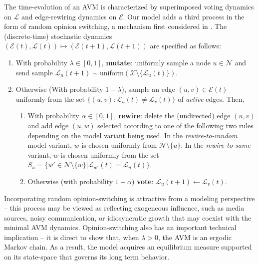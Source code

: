 \documentclass[review, onefignum, onetabnum]{siamart171218}
\begin{document}
	The time-evolution of an AVM is characterized by superimposed voting dynamics on $\mathcal{L}$ and edge-rewiring dynamics on $\mathcal{E}$. 
	Our model adds a third process in the form of random opinion switching, a mechanism first considered in \cite{Ji2013}. 
	The (discrete-time) stochastic dynamics $(\mathcal{E}(t), \mathcal{L}(t)) \mapsto (\mathcal{E}(t+1), \mathcal{L}(t+1))$ are specified as follows:
		\begin{enumerate}
			\item With probability $\lambda \in [0,1]$, \textbf{mutate}: uniformly sample a node $u\in \mathcal{N}$ and send sample $\mathcal{L}_u(t+1)  \sim \mathrm{uniform}(\mathcal{X}\setminus \{\mathcal{L}_u(t)\})$.  
			\item Otherwise (With probability $1-\lambda$),  sample an edge $(u,v) \in \mathcal{E}(t)$ uniformly from the set $\{(u,v):\mathcal{L}_u(t) \neq \mathcal{L}_v(t)\}$ of \emph{active} edges. Then, 
			\begin{enumerate}
				\item With probability $\alpha \in [0,1]$, \textbf{rewire}: delete the (undirected) edge $(u,v)$ and add edge $(u,w)$ selected according to one of the following two rules depending on the model variant being used. 
				In the \emph{rewire-to-random} model variant, $w$ is chosen uniformly from $\mathcal{N}\setminus \{u\}$. 
				In the \emph{rewire-to-same} variant, $w$ is chosen uniformly from the set $S_u = \{w' \in \mathcal{N}\setminus \{w\} | \mathcal{L}_{w'}(t) = \mathcal{L}_u(t)\}$. 
				\item Otherwise (with probability $1-\alpha$) \textbf{vote}:  $\mathcal{L}_u(t+1) \gets \mathcal{L}_v(t)$. 
			\end{enumerate}
		\end{enumerate}
	Incorporating random opinion-switching is attractive from a modeling perspective -- this process may be viewed as reflecting exogeneous influence, such as media sources, noisy communication, or idiosyncratic growth that may coexist with the minimal AVM dynamics.  
	Opinion-switching also has an important technical implication -- it is direct to show that, when $\lambda > 0$, the AVM is an ergodic Markov chain. 
	As a result, the model acquires an equilibrium measure supported on its state-space that governs its long term behavior. 
	
\end{document}
